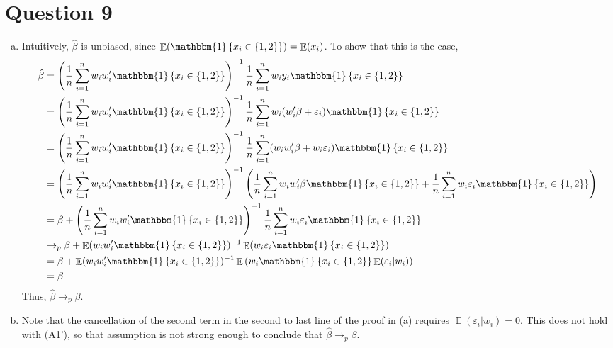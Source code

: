 \documentclass{article}
\newcommand{\est}[1]{\frac{1}{#1}\sum_{i=1}^{#1}}
\newcommand{\bhat}{\hat{\beta}}
\newcommand{\one}[1]{\mathbbm{1}\left\{#1\right\}}
\DeclareMathOperator{\E}{\mathbb{E}}%
\begin{document}
\section*{Question 9}
\begin{enumerate}[(a)]
	\item Intuitively, $\hat{\beta}$ is unbiased, since ${\E(\one{x_i\in\{1,2\}})=\E(x_i)}$. To show that this is the case,
		\begin{align*}
			\bhat	&= \left(\est{n}w_iw_i'\one{x_i\in\{1,2\}}\right)^{-1}\est{n}w_iy_i\one{x_i\in\{1,2\}}	\\
					&= \left(\est{n}w_iw_i'\one{x_i\in\{1,2\}}\right)^{-1}\est{n}w_i(w_i'\beta + \varepsilon_i)\one{x_i\in\{1,2\}}	\\
					&= \left(\est{n}w_iw_i'\one{x_i\in\{1,2\}}\right)^{-1}\est{n}(w_iw_i'\beta + w_i\varepsilon_i)\one{x_i\in\{1,2\}}	\\
					&= \left(\est{n}w_iw_i'\one{x_i\in\{1,2\}}\right)^{-1}\left(\est{n}w_iw_i'\beta\one{x_i\in\{1,2\}} + \est{n}w_i\varepsilon_i\one{x_i\in\{1,2\}}\right)	\\
					&= \beta + \left(\est{n}w_iw_i'\one{x_i\in\{1,2\}}\right)^{-1}\est{n}w_i\varepsilon_i\one{x_i\in\{1,2\}}	\\
					&\rightarrow_p \beta + \E(w_iw_i'\one{x_i\in\{1,2\}})^{-1}\E(w_i\varepsilon_i\one{x_i\in\{1,2\}})	\\
					&= \beta + \E(w_iw_i'\one{x_i\in\{1,2\}})^{-1}\E\left(w_i\one{x_i\in\{1,2\}}\E(\varepsilon_i|w_i)\right)	\\
					&= \beta
		\end{align*}
		Thus, ${\bhat\rightarrow_p\beta}$.
	
	\item Note that the cancellation of the second term in the second to last line of the proof in (a) requires ${\E(\varepsilon_i|w_i)=0}$. This does not hold with (A1'), so that assumption is not strong enough to conclude that ${\bhat\rightarrow_p\beta}$.
	

\end{enumerate}
\end{document}
